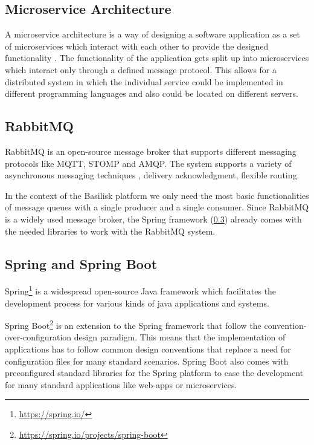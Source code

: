 \subsection{Microservice Architecture}
\label{sec:microservice_architecture}
A microservice architecture is a way of designing a software application as a set of microservices which interact with each other to provide the designed functionality \cite{dragoniMicroservicesYesterdayToday2017, MicroservicesHttpsMartinfowler}.
The functionality of the application gets split up into microservices which interact only through a defined message protocol.
This allows for a distributed system in which the individual service could be implemented in different programming languages and also could be located on different servers.


\subsection{RabbitMQ}
\label{sec:rabbitmq}
RabbitMQ is an open-source message broker that supports different messaging protocols like MQTT, STOMP and AMQP.
The system supports a variety of asynchronous messaging techniques \eg, delivery acknowledgment, flexible routing\cite{RabbitMQWebsiteHttps}.

In the context of the Basilisk platform we only need the most basic functionalities of message queues with a single producer and a single consumer.
Since RabbitMQ is a widely used message broker, the Spring framework (\ref{sec:spring}) already comes with the needed libraries to work with the RabbitMQ system.


\subsection{Spring and Spring Boot}
\label{sec:spring}
Spring\footnote{\url{https://spring.io/}} is a widespread open-source Java framework which facilitates the development process for various kinds of java applications and systems.

Spring Boot\footnote{\url{https://spring.io/projects/spring-boot}} is an extension to the Spring framework that follow the convention-over-configuration design paradigm.
This means that the implementation of applications has to follow common design conventions that replace a need for configuration files for many standard scenarios.
Spring Boot also comes with preconfigured standard libraries for the Spring platform to ease the development for many standard applications like web-apps or microservices.

